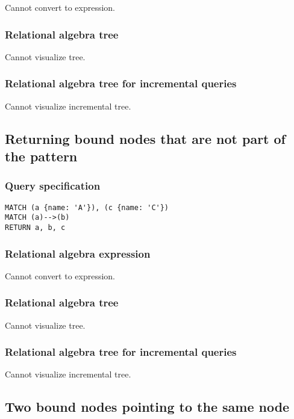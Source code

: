 Cannot convert to expression.

\subsubsection*{Relational algebra tree}

Cannot visualize tree.

\subsubsection*{Relational algebra tree for incremental queries}

Cannot visualize incremental tree.

\subsection{Returning bound nodes that are not part of the pattern}

\subsubsection*{Query specification}

\begin{lstlisting}
MATCH (a {name: 'A'}), (c {name: 'C'})
MATCH (a)-->(b)
RETURN a, b, c
\end{lstlisting}

\subsubsection*{Relational algebra expression}

Cannot convert to expression.

\subsubsection*{Relational algebra tree}

Cannot visualize tree.

\subsubsection*{Relational algebra tree for incremental queries}

Cannot visualize incremental tree.

\subsection{Two bound nodes pointing to the same node}

